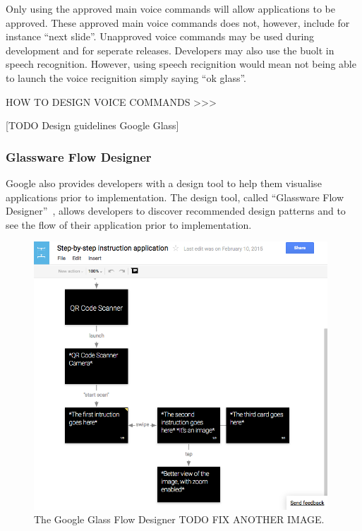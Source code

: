 Only using the approved main voice commands will allow applications to be approved. These approved main voice commands does not, however, include for instance ``next slide''. Unapproved voice commands may be used during development and for seperate releases. Developers may also use the buolt in speech recognition. However, using speech recignition would mean not being able to launch the voice recignition simply saying ``ok glass''.

HOW TO DESIGN VOICE COMMANDS >>> \cite{glassVoiceChecklist}

[TODO Design guidelines Google Glass]




\subsubsection{Glassware Flow Designer}
Google also provides developers with a design tool to help them visualise applications prior to implementation. The design tool, called ``Glassware Flow Designer''~\cite{glasswareFlowDesigner}, allows developers to discover recommended design patterns and to see the flow of their application prior to implementation.

	\begin{figure}[ht!]
		\centering
		\includegraphics[width=110mm]{images/glaswareFlowDesignerScreenshot}
		\caption{The Google Glass Flow Designer TODO FIX ANOTHER IMAGE.}
		\label{GlassDesignStyle}
	\end{figure}